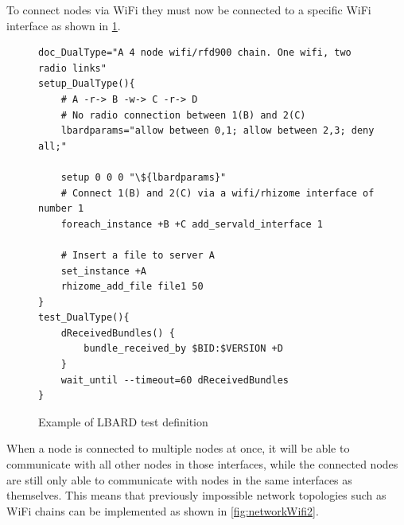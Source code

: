 To connect nodes via WiFi they must now be connected to a specific WiFi interface as shown in \figurename{ \ref{fig:definingInterfaces}}.


\lstset{language=bash,
showstringspaces=false,
numbers=left,
}

\begin{figure}
    \begin{centering}

        \begin{lstlisting}[breaklines, frame=single]
doc_DualType="A 4 node wifi/rfd900 chain. One wifi, two radio links"
setup_DualType(){
    # A -r-> B -w-> C -r-> D
    # No radio connection between 1(B) and 2(C)
    lbardparams="allow between 0,1; allow between 2,3; deny all;"

    setup 0 0 0 "\${lbardparams}"
    # Connect 1(B) and 2(C) via a wifi/rhizome interface of number 1
    foreach_instance +B +C add_servald_interface 1

    # Insert a file to server A
    set_instance +A
    rhizome_add_file file1 50
}
test_DualType(){
    dReceivedBundles() {
        bundle_received_by $BID:$VERSION +D
    }
    wait_until --timeout=60 dReceivedBundles
}
        \end{lstlisting}
        \caption{Example of LBARD test definition}
        \label{fig:definingInterfaces}
    \end{centering}
\end{figure}

When a node is connected to multiple nodes at once, it will be able to communicate with all other nodes in those interfaces, while the connected nodes are still only able to communicate with nodes in the same interfaces as themselves.
This means that previously impossible network topologies such as WiFi chains can be implemented as shown in \figurename{ \ref{fig:networkWifi2}}.

